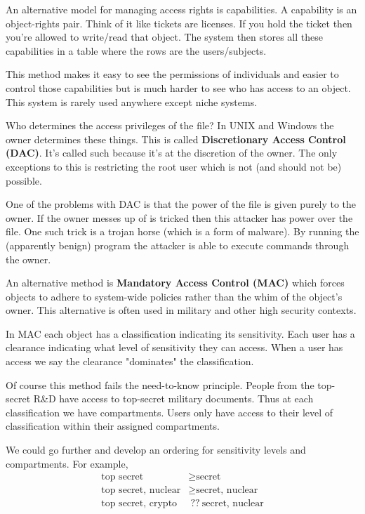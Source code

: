 \documentclass{report}
\begin{document}
An alternative model for managing access rights is capabilities. A capability is
an object-rights pair. Think of it like tickets are licenses. If you hold the
ticket then you're allowed to write/read that object.
The system then stores all these capabilities in a table where the rows are the
users/subjects.

This method makes it easy to see the permissions of individuals and easier to
control those capabilities but is much harder to see who has access to an 
object. This system is rarely used anywhere except niche systems.

Who determines the access privileges of the file? In UNIX and Windows the owner
determines these things. This is called 
\textbf{Discretionary Access Control (DAC)}.
It's called such because it's at the discretion of the owner.
The only exceptions to this is restricting the root user which is not
(and should not be) possible.

One of the problems with DAC is that the power of the file is given purely to
the owner. If the owner messes up of is tricked then this attacker has power
over the file. One such trick is a trojan horse (which is a form of malware).
By running the (apparently benign) program the attacker is able to execute
commands through the owner.

An alternative method is \textbf{Mandatory Access Control (MAC)}
which forces objects to
adhere to system-wide policies rather than the whim of the object's owner. This
alternative is often used in military and other high security contexts.

In MAC each object has a classification indicating its sensitivity.
Each user has a clearance indicating what level of sensitivity they can access.
When a user has access we say the clearance "dominates" the classification.

Of course this method fails the need-to-know principle. People from the
top-secret R\&D have access to top-secret military documents. Thus at each
classification we have compartments. Users only have access to their level of
classification within their assigned compartments.

We could go further and develop an ordering for sensitivity levels and
compartments. For example,
\begin{align*}
    \text{top secret} &\geq \text{secret} \\
    \text{top secret, nuclear} &\geq \text{secret, nuclear} \\
    \text{top secret, crypto} &{\ ??\ } \text{secret, nuclear}
\end{align*}
\end{document}
